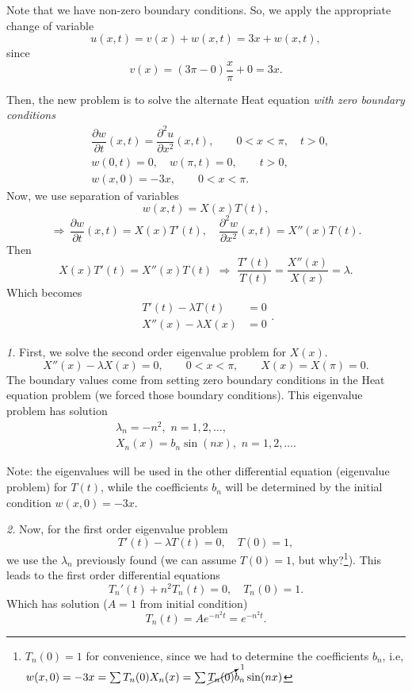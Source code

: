 \documentclass[11pt]{article}
\begin{document}
\begin{solution}
Note that we have non-zero boundary conditions. So, we apply the appropriate change of variable
\[u(x,t)=v(x)+w(x, t)=3x + w(x,t),\]
since
\[v(x)=(3\pi-0)\frac{x}{\pi}+0=3x.\]

Then, the new problem is to solve the alternate Heat equation \textsl{with zero boundary conditions}
\begin{equation*} \begin{split}
& \dfrac{\partial w }{\partial t } (x,t) = \dfrac{\partial^2 u}{\partial x^2}(x,t), \qquad 0<x<\pi, \quad t>0, \\
& w(0,t) = 0, \quad w(\pi,t)= 0, \qquad t>0, \\
& w(x,0) = -3x, \qquad 0<x<\pi.
\end{split}\end{equation*}
Now, we use separation of variables
\[w(x,t)=X(x)T(t),\]
\[\Rightarrow\, \frac{\partial w}{\partial t}(x,t)=X(x)T'(t),\quad \frac{\partial^{2} w}{\partial x^{2}}(x,t)=X''(x)T(t).\]
Then 
\[X(x)T'(t)=X''(x)T(t) \,\,\Rightarrow\,\, \frac{T'(t)}{T(t)}=\frac{X''(x)}{X(x)}=\lambda.\]
Which becomes
\[\begin{split}T'(t)-\lambda T(t)&=0 \\ X''(x)-\lambda X(x)&=0 \end{split}.\]

\textsl{1. } First, we solve the second order eigenvalue problem for $X(x)$.
\[X''(x)-\lambda X(x)=0, \qquad 0<x<\pi, \qquad  X(x)=X(\pi)=0.\]
The boundary values come from setting zero boundary conditions in the Heat equation problem (we forced those boundary conditions). This eigenvalue problem has solution 
\[\begin{split}
  \lambda_{n}=-n^{2}, \,\, n=1, 2, \dots, \\
  X_{n}(x)=b_{n}\sin(nx), \,\, n=1, 2, \dots.
  \end{split}
\]

Note: the eigenvalues will be used in the other differential equation (eigenvalue problem) for $T(t)$, while the coefficients $b_{n}$ will be determined by the initial condition $w(x,0)=-3x$. 

\textsl{2. } Now, for the first order eigenvalue problem
\[T'(t)-\lambda T(t)=0, \quad T(0)=1,\]
we use the $\lambda_{n}$ previously found (we can assume $T(0)=1$, but why?\footnote{$T_{n}(0)=1$ for convenience, since we had to determine the coefficients $b_{n}$, i.e, $w(x,0)=-3x=\sum T_{n}(0)X_{n}(x)= \sum \cancelto{1}{T_{n}(0)} b_{n}\sin(nx)$}). This leads to the first order differential equations
\[T_{n}'(t) +n^{2} T_{n}(t)=0, \quad T_{n}(0)=1.\]
Which has solution ($A=1$ from initial condition)
\[T_{n}(t)=Ae^{-n^{2}t}=e^{-n^{2}t}.\]


\end{solution}
\end{document}
